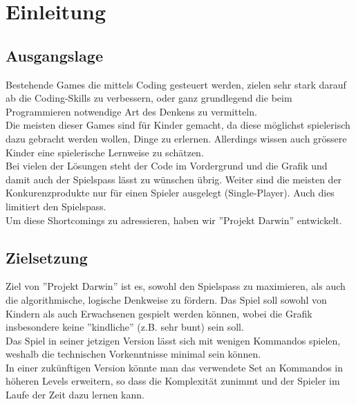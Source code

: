 \documentclass[11pt,a4paper,titlepage]{article}
\begin{document}
\tableofcontents

\newpage

\section{Einleitung}
\subsection{Ausgangslage}


Bestehende Games die mittels Coding gesteuert werden, zielen sehr stark darauf ab die Coding-Skills zu verbessern, oder ganz grundlegend die beim Programmieren notwendige Art des Denkens zu vermitteln.\\
Die meisten dieser Games sind für Kinder gemacht, da diese möglichst spielerisch dazu gebracht werden wollen, Dinge zu erlernen. Allerdings wissen auch grössere Kinder eine spielerische Lernweise zu schätzen. \\
Bei vielen der Lösungen steht der Code im Vordergrund und die Grafik und damit auch der Spielspass lässt zu wünschen übrig. 
Weiter sind die meisten der Konkurenzprodukte nur für einen Spieler ausgelegt (Single-Player). Auch dies limitiert den Spielspass.\\
Um diese Shortcomings zu adressieren, haben wir ''Projekt Darwin'' entwickelt.

\subsection{Zielsetzung}



Ziel von ''Projekt Darwin'' ist es, sowohl den Spielspass zu maximieren, als auch die algorithmische, logische Denkweise zu fördern. Das Spiel soll sowohl von Kindern als auch Erwachsenen gespielt werden können, wobei die Grafik insbesondere keine ''kindliche'' (z.B. sehr bunt) sein soll.\\
Das Spiel in seiner jetzigen Version lässt sich mit wenigen Kommandos spielen, weshalb die technischen Vorkenntnisse minimal sein können.\\
 In einer zukünftigen Version könnte man das verwendete Set an Kommandos in höheren Levels erweitern, so dass die Komplexität zunimmt und der Spieler im Laufe der Zeit dazu lernen kann.
\end{document}
